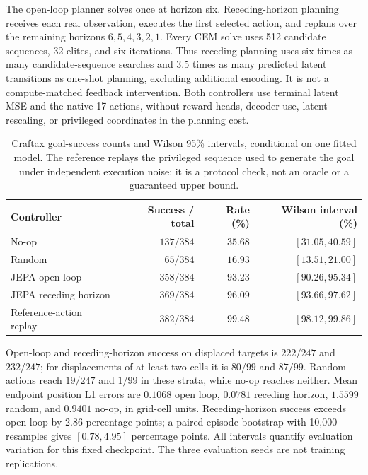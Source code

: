 The open-loop planner solves once at horizon six. Receding-horizon planning receives each real
observation, executes the first selected action, and replans over the remaining horizons
$6,5,4,3,2,1$. Every CEM solve uses 512 candidate sequences, 32 elites, and six iterations. Thus
receding planning uses six times as many candidate-sequence searches and 3.5 times as many predicted
latent transitions as one-shot planning, excluding additional encoding. It is not a compute-matched
feedback intervention. Both controllers use terminal latent MSE and the native 17 actions, without
reward heads, decoder use, latent rescaling, or privileged coordinates in the planning cost.

\begin{table}[ht]
\centering
\caption{Craftax goal-success counts and Wilson 95\% intervals, conditional on one fitted model.
The reference replays the privileged sequence used to generate the goal under independent execution
noise; it is a protocol check, not an oracle or a guaranteed upper bound.}
\label{tab:craftax-counts}
\begin{tabular}{lrrr}
\toprule
Controller & Success / total & Rate (\%) & Wilson interval (\%) \\
\midrule
No-op & $137/384$ & $35.68$ & $[31.05,40.59]$ \\
Random & $65/384$ & $16.93$ & $[13.51,21.00]$ \\
JEPA open loop & $358/384$ & $93.23$ & $[90.26,95.34]$ \\
JEPA receding horizon & $369/384$ & $96.09$ & $[93.66,97.62]$ \\
Reference-action replay & $382/384$ & $99.48$ & $[98.12,99.86]$ \\
\bottomrule
\end{tabular}
\end{table}

Open-loop and receding-horizon success on displaced targets is $222/247$ and $232/247$; for
displacements of at least two cells it is $80/99$ and $87/99$. Random actions reach $19/247$ and
$1/99$ in these strata, while no-op reaches neither. Mean endpoint position L1 errors are $0.1068$
open loop, $0.0781$ receding horizon, $1.5599$ random, and $0.9401$ no-op, in grid-cell units.
Receding-horizon success exceeds open loop by 2.86 percentage points; a paired episode bootstrap
with 10,000 resamples gives $[0.78,4.95]$ percentage points. All intervals quantify evaluation
variation for this fixed checkpoint. The three evaluation seeds are not training replications.

